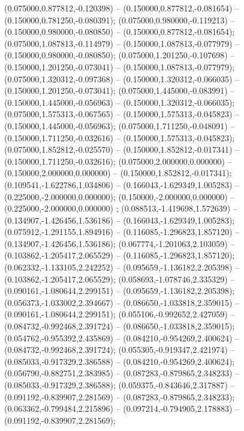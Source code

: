  (0.075000,0.877812,-0.120398) -- (0.150000,0.877812,-0.081654) -- (0.150000,0.781250,-0.080391);
 (0.075000,0.980000,-0.119213) -- (0.150000,0.980000,-0.080850) -- (0.150000,0.877812,-0.081654);
 (0.075000,1.087813,-0.114979) -- (0.150000,1.087813,-0.077979) -- (0.150000,0.980000,-0.080850);
 (0.075000,1.201250,-0.107698) -- (0.150000,1.201250,-0.073041) -- (0.150000,1.087813,-0.077979);
 (0.075000,1.320312,-0.097368) -- (0.150000,1.320312,-0.066035) -- (0.150000,1.201250,-0.073041);
 (0.075000,1.445000,-0.083991) -- (0.150000,1.445000,-0.056963) -- (0.150000,1.320312,-0.066035);
 (0.075000,1.575313,-0.067565) -- (0.150000,1.575313,-0.045823) -- (0.150000,1.445000,-0.056963);
 (0.075000,1.711250,-0.048091) -- (0.150000,1.711250,-0.032616) -- (0.150000,1.575313,-0.045823);
 (0.075000,1.852812,-0.025570) -- (0.150000,1.852812,-0.017341) -- (0.150000,1.711250,-0.032616);
 (0.075000,2.000000,0.000000) -- (0.150000,2.000000,0.000000) -- (0.150000,1.852812,-0.017341);
 (0.109541,-1.622786,1.034806) -- (0.166043,-1.629349,1.005283) -- (0.225000,-2.000000,0.000000);
 (0.150000,-2.000000,0.000000) -- (0.225000,-2.000000,0.000000) ;
 (0.088513,-1.419698,1.572639) -- (0.134907,-1.426456,1.536186) -- (0.166043,-1.629349,1.005283);
 (0.075912,-1.291155,1.894916) -- (0.116085,-1.296823,1.857120) -- (0.134907,-1.426456,1.536186);
 (0.067774,-1.201063,2.103059) -- (0.103862,-1.205417,2.065529) -- (0.116085,-1.296823,1.857120);
 (0.062332,-1.133105,2.242252) -- (0.095659,-1.136182,2.205398) -- (0.103862,-1.205417,2.065529);
 (0.058693,-1.078746,2.335329) -- (0.090161,-1.080644,2.299151) -- (0.095659,-1.136182,2.205398);
 (0.056373,-1.033002,2.394667) -- (0.086650,-1.033818,2.359015) -- (0.090161,-1.080644,2.299151);
 (0.055106,-0.992652,2.427059) -- (0.084732,-0.992468,2.391724) -- (0.086650,-1.033818,2.359015);
 (0.054762,-0.955392,2.435869) -- (0.084210,-0.954269,2.400624) -- (0.084732,-0.992468,2.391724);
 (0.055305,-0.919347,2.421974) -- (0.085033,-0.917329,2.386588) -- (0.084210,-0.954269,2.400624);
 (0.056790,-0.882751,2.383985) -- (0.087283,-0.879865,2.348233) -- (0.085033,-0.917329,2.386588);
 (0.059375,-0.843646,2.317887) -- (0.091192,-0.839907,2.281569) -- (0.087283,-0.879865,2.348233);
 (0.063362,-0.799484,2.215896) -- (0.097214,-0.794905,2.178883) -- (0.091192,-0.839907,2.281569);
